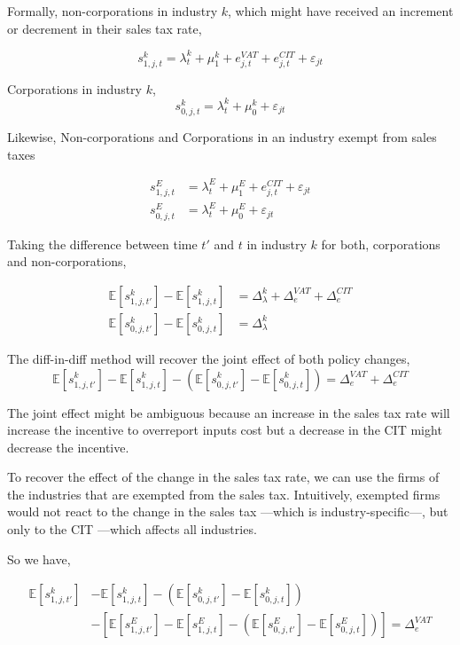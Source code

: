 \documentclass[
  12pt]{article}
\theoremstyle{definition}
\theoremstyle{remark}
\begin{document}
Formally, non-corporations in industry \(k\), which might have received
an increment or decrement in their sales tax rate,

\[
s_{1,j,t}^k=\lambda^k_t+\mu^k_1+e^{VAT}_{j,t}+e^{CIT}_{j,t}+\varepsilon_{jt}
\]

Corporations in industry \(k\), \[
s_{0,j,t}^k=\lambda^k_t+\mu^k_0+\varepsilon_{jt}
\]

Likewise, Non-corporations and Corporations in an industry exempt from
sales taxes

\[
\begin{aligned}
    s_{1,j,t}^{E}&=\lambda^{E}_t+\mu^E_1+e^{CIT}_{j,t}+\varepsilon_{jt}\\
    s_{0,j,t}^E&=\lambda^E_t+\mu^E_0+\varepsilon_{jt}
\end{aligned}
\]

Taking the difference between time \(t'\) and \(t\) in industry \(k\)
for both, corporations and non-corporations,

\[
\begin{aligned}
    \mathbb{E}[s_{1,j,t'}^k]-\mathbb{E}[s_{1,j,t}^k]&=\Delta_\lambda^k+\Delta_e^{VAT}+\Delta_e^{CIT}\\
    \mathbb{E}[s_{0,j,t'}^k]-\mathbb{E}[s_{0,j,t}^k]&=\Delta_\lambda^k
\end{aligned}
\]

The diff-in-diff method will recover the joint effect of both policy
changes, \[
\mathbb{E}[s_{1,j,t'}^k]-\mathbb{E}[s_{1,j,t}^k]-\left(\mathbb{E}[s_{0,j,t'}^k]-\mathbb{E}[s_{0,j,t}^k]\right)=\Delta_e^{VAT}+\Delta_e^{CIT}
\]

The joint effect might be ambiguous because an increase in the sales tax
rate will increase the incentive to overreport inputs cost but a
decrease in the CIT might decrease the incentive.

To recover the effect of the change in the sales tax rate, we can use
the firms of the industries that are exempted from the sales tax.
Intuitively, exempted firms would not react to the change in the sales
tax ---which is industry-specific---, but only to the CIT ---which
affects all industries.

So we have,

\[
\begin{aligned}    
    \mathbb{E}[s_{1,j,t'}^k]&-\mathbb{E}[s_{1,j,t}^k]-\left(\mathbb{E}[s_{0,j,t'}^k]-\mathbb{E}[s_{0,j,t}^k]\right)\\ 
    &- \left[\mathbb{E}[s_{1,j,t'}^{E}]-\mathbb{E}[s_{1,j,t}^{E}]-\left(\mathbb{E}[s_{0,j,t'}^{E}]-\mathbb{E}[s_{0,j,t}^{E}]\right)\right]=\Delta_e^{VAT}
\end{aligned}
\]
\end{document}

